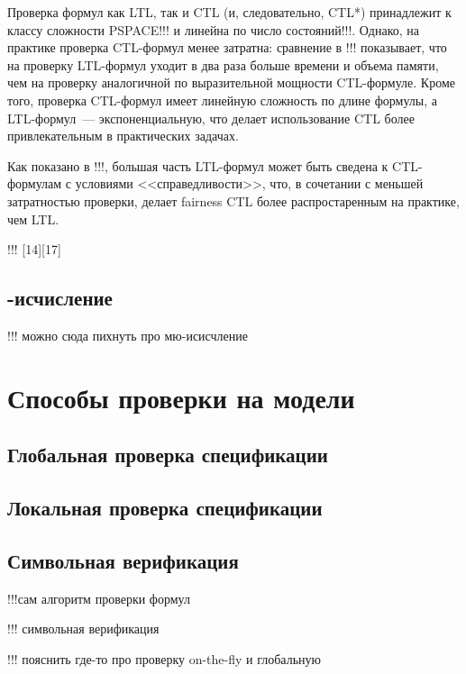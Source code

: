 \documentclass[a4paper,notitlepage,14pt]{article}
\begin{document}
Проверка формул как LTL, так и CTL (и, следовательно, CTL*) принадлежит к классу сложности
PSPACE!!! и линейна по число состояний!!!. Однако, на практике проверка CTL-формул менее
затратна: сравнение в !!! показывает, что на проверку LTL-формул уходит в два раза больше
времени и объема памяти, чем на проверку аналогичной по выразительной мощности
CTL-формуле. Кроме того, проверка CTL-формул имеет линейную сложность по длине формулы, а
LTL-формул~--- экспоненциальную, что делает использование CTL более привлекательным в
практических задачах.

Как показано в !!!, большая часть LTL-формул может быть сведена к CTL-формулам с условиями
<<справедливости>>, что, в сочетании с меньшей затратностью проверки, делает fairness CTL
более распростаренным на практике, чем LTL.

!!! [14][17]


\subsection{\mu-исчисление}
\label{sec:mu-calculus}

!!! можно сюда пихнуть про мю-исисчление

\section{Способы проверки на модели}
\label{sec:modelchk-methods}

\subsection{Глобальная проверка спецификации}
\label{sec:global}

\subsection{Локальная проверка спецификации}
\label{sec:local}

\subsection{Символьная верификация}
\label{sec:symbolic}

!!!сам алгоритм проверки формул

!!! символьная верификация

!!! пояснить где-то про проверку on-the-fly и глобальную
\end{document}
